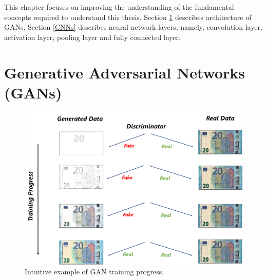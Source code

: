 \justifying
\setlength{\parskip}{1em}

This chapter focuses on improving the understanding of the fundamental concepts required to understand this thesis. Section \ref{GenerativeAdversarialNetworks} describes architecture of \acp{GAN}. Section \ref{CNNs} describes neural network layers, namely, convolution layer, activation layer, pooling layer and fully connected layer.


\section{Generative Adversarial Networks (GANs)}\label{GenerativeAdversarialNetworks}

\begin{figure}[H]
        \begin{center}
	    \includegraphics[scale=0.30]{images/Fundamentals/GANTrainingintuition.png}
	    \caption[Intuitive example of \ac{GAN} training progress.]{Intuitive example of \ac{GAN} training progress.}
	    \label{fig:GANTrainingintuition}
	    \end{center}
\end{figure}



